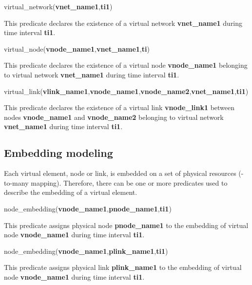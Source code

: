 \begin{myformula}
virtual\_network(\textbf{vnet\_name1},\textbf{ti1})
\end{myformula}

This predicate declares the existence of a virtual network \textbf{vnet\_name1} during time interval \textbf{ti1}.

\begin{myformula}
virtual\_node(\textbf{vnode\_name1},\textbf{vnet\_name1},\textbf{ti})
\end{myformula}

This predicate declares the existence of a virtual node \textbf{vnode\_name1} belonging to virtual network \textbf{vnet\_name1} during time interval \textbf{ti1}.

\begin{myformula}
virtual\_link(\textbf{vlink\_name1},\textbf{vnode\_name1},\textbf{vnode\_name2},\textbf{vnet\_name1},\textbf{ti1})
\end{myformula}

This predicate declares the existence of a virtual link \textbf{vnode\_link1} between nodes \textbf{vnode\_name1} and \textbf{vnode\_name2} belonging to virtual network \textbf{vnet\_name1} during time interval \textbf{ti1}.


\subsection{Embedding modeling}
Each virtual element, node or link, is embedded on a set of physical resources (-to-many mapping).
Therefore, there can be one or more predicates used to describe the embedding of a virtual element.

\begin{myformula}
node\_embedding(\textbf{vnode\_name1},\textbf{pnode\_name1},\textbf{ti1})
\end{myformula}

This predicate assigns physical node \textbf{pnode\_name1} to the embedding of virtual node \textbf{vnode\_name1} during time interval \textbf{ti1}.

\begin{myformula}
node\_embedding(\textbf{vnode\_name1},\textbf{plink\_name1},\textbf{ti1})
\end{myformula}

This predicate assigns physical link \textbf{plink\_name1} to the embedding of virtual node \mbox{\textbf{vnode\_name1}} during time interval \textbf{ti1}.

